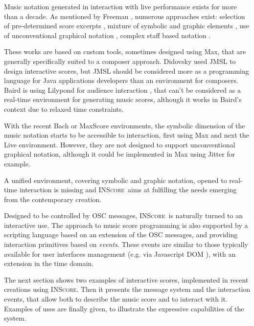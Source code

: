 \documentclass{article}
\newcommand{\inscore}		{\textsc{\small INScore}}
\begin{document}
Music notation generated in interaction with live performance exists for more than a decade. As mentioned by Freeman \cite{Freeman:2008:ESM:1403124.1403129}, numerous approaches exist: selection of pre-determined score excerpts \cite{Kim-Boyle:2005:MSG:1085939.1086007}, mixture of symbolic and graphic elements \cite{winkler2004}, use of unconventional graphical notation \cite{Gutknecht:2005:GUR:1085939.1085980}, complex staff based notation \cite{didkovsky2004recent}. 

These works are based on custom tools, sometimes designed using Max, that are generally specifically suited to a composer approach. Didovsky used JMSL \cite{didkovsky2001java} to design interactive scores, but JMSL should be considered more as a programming language for Java applications developers than an environment for composers. Baird is using Lilypond \cite{lilypond03} for audience interaction \cite{Baird:2005:RGM:1085939.1086008}, that can't be considered as a real-time environment for generating music scores, although it works in Baird's context due to relaxed time constraints.

With the recent Bach \cite{agostini12b} or MaxScore \cite{didko08} environments, the symbolic dimension of the music notation starts to be accessible to interaction, first using Max and next the Live environment. However, they are not designed to support unconventional graphical notation, although it could be implemented in Max using Jitter for example.

A unified environment, covering symbolic and graphic notation, opened to real-time interaction is missing and \inscore\ aims at fulfilling the needs emerging from the contemporary creation. 


Designed to be controlled by OSC messages, \inscore\ is naturally turned to an interactive use. The approach to music score programming is also supported by a scripting language based on an extension of the OSC messages, and providing interaction primitives based on \emph{events}. These events are similar to those typically available for user interfaces management (e.g. via Javascript DOM \cite{dom3ev}), with an extension in the time domain.

The next section shows two examples of interactive scores, implemented in recent creations using \inscore. Then it presents the message system and the interaction events, that allow both to describe the music score and to interact with it. Examples of uses are finally given, to illustrate the expressive capabilities of the system.
\end{document}
